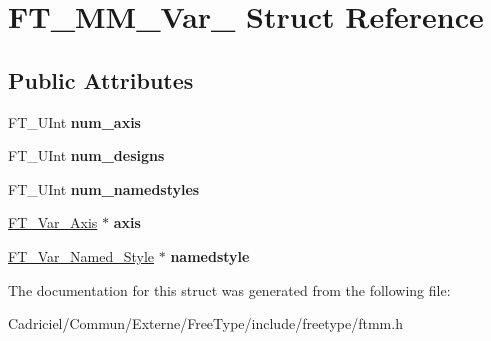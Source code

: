 \hypertarget{struct_f_t___m_m___var__}{\section{F\-T\-\_\-\-M\-M\-\_\-\-Var\-\_\- Struct Reference}
\label{struct_f_t___m_m___var__}
}
\subsection*{Public Attributes}
\begin{DoxyCompactItemize}
\item 
\hypertarget{struct_f_t___m_m___var___acd32d4eb128f6fd9f6fde7da4c7b99bf}{F\-T\-\_\-\-U\-Int {\bfseries num\-\_\-axis}}\label{struct_f_t___m_m___var___acd32d4eb128f6fd9f6fde7da4c7b99bf}

\item 
\hypertarget{struct_f_t___m_m___var___a5109a6a20626d90ed44cd64363d29e92}{F\-T\-\_\-\-U\-Int {\bfseries num\-\_\-designs}}\label{struct_f_t___m_m___var___a5109a6a20626d90ed44cd64363d29e92}

\item 
\hypertarget{struct_f_t___m_m___var___ac54bdd53447f4967b5d3b1a341a4bdff}{F\-T\-\_\-\-U\-Int {\bfseries num\-\_\-namedstyles}}\label{struct_f_t___m_m___var___ac54bdd53447f4967b5d3b1a341a4bdff}

\item 
\hypertarget{struct_f_t___m_m___var___a19cc7772e057dad1c4acd6e744328466}{\hyperlink{struct_f_t___var___axis__}{F\-T\-\_\-\-Var\-\_\-\-Axis} $\ast$ {\bfseries axis}}\label{struct_f_t___m_m___var___a19cc7772e057dad1c4acd6e744328466}

\item 
\hypertarget{struct_f_t___m_m___var___acda1ec5211250ddc06ec090f695adabf}{\hyperlink{struct_f_t___var___named___style__}{F\-T\-\_\-\-Var\-\_\-\-Named\-\_\-\-Style} $\ast$ {\bfseries namedstyle}}\label{struct_f_t___m_m___var___acda1ec5211250ddc06ec090f695adabf}

\end{DoxyCompactItemize}


The documentation for this struct was generated from the following file\-:\begin{DoxyCompactItemize}
\item 
Cadriciel/\-Commun/\-Externe/\-Free\-Type/include/freetype/ftmm.\-h\end{DoxyCompactItemize}
